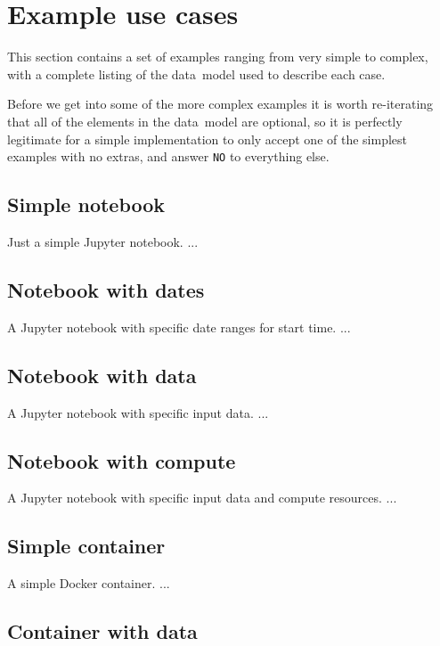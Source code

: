 \documentclass[11pt,a4paper]{ivoa}
\newcommand{\datamodel} {data~model}
\newcommand{\jupyter} {Jupyter}
\newcommand{\jupyternotebook} {Jupyter notebook}
\newcommand{\dockercontainer} {Docker container}
\newcommand{\codeword}[1] {\texttt{#1}}
\begin{document}
\section{Example use cases}
\label{example-usecases}

This section contains a set of examples ranging from very simple to complex, with a complete
listing of the \datamodel{} used to describe each case.

Before we get into some of the more complex examples it is worth re-iterating that all of the
elements in the \datamodel{} are optional, so it is perfectly legitimate for a simple
implementation to only accept one of the simplest examples with no extras, and answer
\codeword{NO} to everything else.

\subsection{Simple notebook}
\label{simple-notebook}

Just a simple \jupyternotebook{}.
...

\subsection{Notebook with dates}
\label{notebook-with-dates}

A \jupyter{} notebook with specific date ranges for start time.
...

\subsection{Notebook with data}
\label{notebook-with-data}

A \jupyternotebook{} with specific input data.
...

\subsection{Notebook with compute}
\label{notebook-with-compute}

A \jupyternotebook{} with specific input data and compute resources.
...

\subsection{Simple container}
\label{simple-container}

A simple \dockercontainer{}.
...

\subsection{Container with data}
\label{container-with-data}
\end{document}
